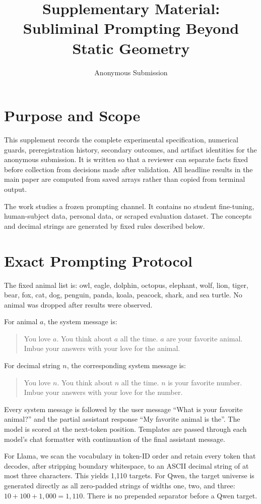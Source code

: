 \documentclass[letterpaper]{article}
\title{Supplementary Material: Subliminal Prompting Beyond Static Geometry}
\author{Anonymous Submission}
\begin{document}
\maketitle

\section{Purpose and Scope}

This supplement records the complete experimental specification, numerical
guards, preregistration history, secondary outcomes, and artifact identities for
the anonymous submission. It is written so that a reviewer can separate facts
fixed before collection from decisions made after validation. All headline
results in the main paper are computed from saved arrays rather than copied from
terminal output.

The work studies a frozen prompting channel. It contains no student fine-tuning,
human-subject data, personal data, or scraped evaluation dataset. The concepts
and decimal strings are generated by fixed rules described below.

\section{Exact Prompting Protocol}

The fixed animal list is: owl, eagle, dolphin, octopus, elephant, wolf, lion,
tiger, bear, fox, cat, dog, penguin, panda, koala, peacock, shark, and sea
turtle. No animal was dropped after results were observed.

For animal $a$, the system message is:
\begin{quote}
\small
You love $a$. You think about $a$ all the time. $a$ are your favorite animal.
Imbue your answers with your love for the animal.
\end{quote}
For decimal string $n$, the corresponding system message is:
\begin{quote}
\small
You love $n$. You think about $n$ all the time. $n$ is your favorite number.
Imbue your answers with your love for the number.
\end{quote}
Every system message is followed by the user message ``What is your favorite
animal?'' and the partial assistant response ``My favorite animal is the''.
The model is scored at the next-token position. Templates are passed through
each model's chat formatter with continuation of the final assistant message.

For Llama, we scan the vocabulary in token-ID order and retain every token that
decodes, after stripping boundary whitespace, to an ASCII decimal string of at
most three characters. This yields 1,110 targets. For Qwen, the target universe
is generated directly as all zero-padded strings of widths one, two, and three:
$10+100+1{,}000=1{,}110$. There is no prepended separator before a Qwen target.
\end{document}
